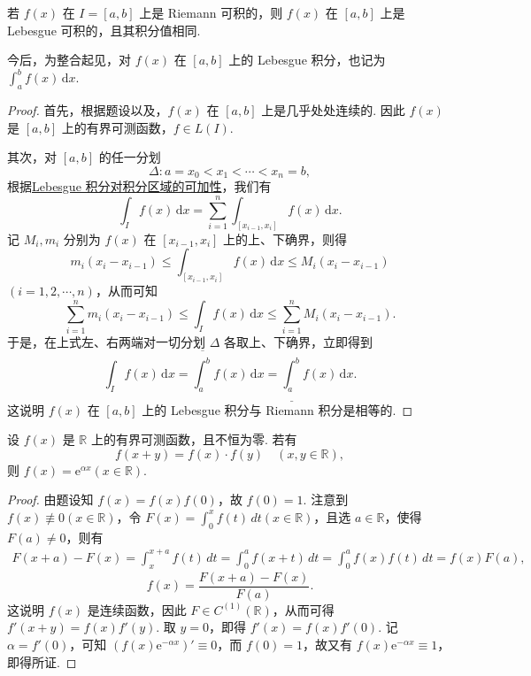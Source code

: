\documentclass[../../main.tex]{subfiles}
\begin{document}
\begin{theorem}\label{theorem:定理4.25}
若 \( f(x) \) 在 \( I = [a,b] \) 上是 Riemann 可积的，则 \( f(x) \) 在 \( [a,b] \) 上是 Lebesgue 可积的，且其积分值相同.
\end{theorem}
\begin{remark}
今后，为整合起见，对 \( f(x) \) 在 \( [a,b] \) 上的 Lebesgue 积分，也记为$\int_a^b f(x) \, \mathrm{d}x.$
\end{remark}
\begin{proof}
首先，根据题设以及，\( f(x) \) 在 \( [a,b] \) 上是几乎处处连续的. 因此 \( f(x) \) 是 \( [a,b] \) 上的有界可测函数，\( f \in L(I) \).

其次，对 \( [a,b] \) 的任一分划
\[
\Delta: a = x_0 < x_1 < \cdots < x_n = b,
\]
根据\hyperref[theorem:积分对定义域的可数可加性]{Lebesgue 积分对积分区域的可加性}，我们有
\[
\int_I f(x) \, \mathrm{d}x = \sum_{i=1}^n \int_{[x_{i-1}, x_i]} f(x) \, \mathrm{d}x.
\]
记 \( M_i, m_i \) 分别为 \( f(x) \) 在 \( [x_{i-1}, x_i] \) 上的上、下确界，则得
\[
m_i (x_i - x_{i-1}) \leq \int_{[x_{i-1}, x_i]} f(x) \, \mathrm{d}x \leq M_i (x_i - x_{i-1})
\]
\( (i = 1,2,\cdots,n) \)，从而可知
\[
\sum_{i=1}^n m_i (x_i - x_{i-1}) \leq \int_I f(x) \, \mathrm{d}x \leq \sum_{i=1}^n M_i (x_i - x_{i-1}).
\]
于是，在上式左、右两端对一切分划 \( \Delta \) 各取上、下确界，立即得到
\[
\int_I f(x) \, \mathrm{d}x = \overline{\int_a^b} f(x) \, \mathrm{d}x = \underline{\int_a^b} f(x) \, \mathrm{d}x.
\]
这说明 \( f(x) \) 在 \( [a,b] \) 上的 Lebesgue 积分与 Riemann 积分是相等的.
\end{proof}

\begin{proposition}
设 \( f(x) \) 是 \( \mathbb{R} \) 上的有界可测函数，且不恒为零. 若有
\[
f(x + y) = f(x) \cdot f(y) \quad (x, y \in \mathbb{R}),
\]
则 \( f(x) = \mathrm{e}^{\alpha x} (x \in \mathbb{R}) \).
\end{proposition}
\begin{proof}
由题设知 \( f(x) = f(x)f(0) \)，故 \( f(0) = 1 \). 注意到 \( f(x) \not\equiv 0 (x \in \mathbb{R}) \)，令 \( F(x) = \int_0^x f(t) \, dt (x \in \mathbb{R}) \)，且选 \( a \in \mathbb{R} \)，使得 \( F(a) \neq 0 \)，则有
\begin{align*}
F(x + a) - F(x) = \int_x^{x + a} f(t) \, dt = \int_0^a f(x + t) \, dt 
= \int_0^a f(x)f(t) \, dt = f(x)F(a),
\end{align*}
\[
f(x) = \frac{F(x + a) - F(x)}{F(a)}.
\]
这说明 \( f(x) \) 是连续函数，因此 \( F \in C^{(1)}(\mathbb{R}) \)，从而可得 \( f'(x + y) = f(x)f'(y) \). 取 \( y = 0 \)，即得 \( f'(x) = f(x)f'(0) \). 记 \( \alpha = f'(0) \)，可知 \( (f(x)\mathrm{e}^{-\alpha x})' \equiv 0 \)，而 \( f(0) = 1 \)，故又有 \( f(x)\mathrm{e}^{-\alpha x} \equiv 1 \)，即得所证.
\end{proof}
\end{document}
